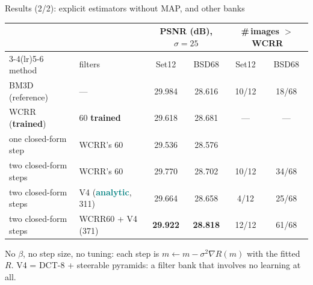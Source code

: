 \documentclass[10pt,aspectratio=169]{beamer}
\newcommand{\EXP}[1]{\textcolor{teal}{\textbf{#1}}}
\newcommand{\TRN}[1]{\textcolor{wine}{\textbf{#1}}}
\newcommand{\WSt}{29.618}\newcommand{\WBs}{28.681}           %
\begin{document}
\begin{frame}{Results (2/2): explicit estimators without MAP, and other banks}
\centering
\small
\renewcommand{\arraystretch}{1.2}
\begin{tabular}{@{}llcccc@{}}
\toprule
 & & \multicolumn{2}{c}{PSNR (dB), $\sigma=25$} & \multicolumn{2}{c}{\#\,images $>$ WCRR}\\
\cmidrule(lr){3-4}\cmidrule(lr){5-6}
method & filters & Set12 & BSD68 & Set12 & BSD68\\\midrule
BM3D (reference) & --- & 29.984 & 28.616 & 10/12 & 18/68\\
WCRR (\TRN{trained}) & 60 \TRN{trained} & \WSt & \WBs & --- & ---\\\midrule
one closed-form step & WCRR's 60 & 29.536 & 28.576 & & \\
two closed-form steps & WCRR's 60 & 29.770 & 28.702 & 10/12 & 34/68\\
two closed-form steps & V4 (\EXP{analytic}, 311) & 29.664 & 28.658 & 4/12 & 25/68\\
two closed-form steps & WCRR60 + V4 (371) & \textbf{29.922} & \textbf{28.818} & 12/12 & 61/68\\
\bottomrule
\end{tabular}

\medskip
\begin{keybox}
\small No $\beta$, no step size, no tuning: each step is $m\leftarrow m-\sigma^2\nabla R(m)$ with the
fitted $R$. V4 = DCT-8 + steerable pyramids: a filter bank that involves no learning at all.
\end{keybox}
\end{frame}
\end{document}
